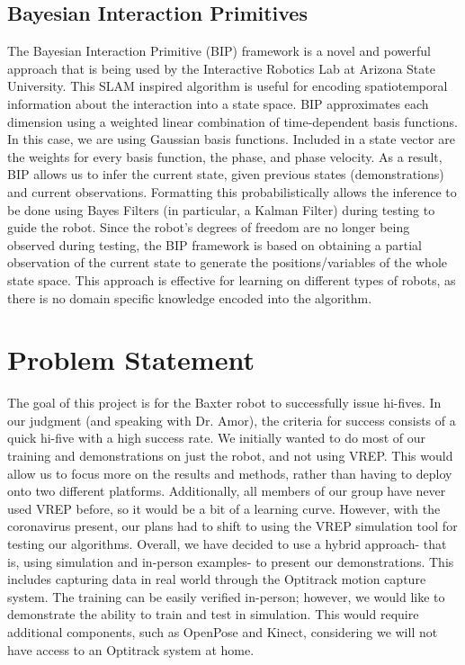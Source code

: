 \documentclass[letterpaper, 10 pt, conference]{ieeeconf}  %
\begin{document}
\subsection{Bayesian Interaction Primitives}
The Bayesian Interaction Primitive (BIP) framework is a novel and powerful approach that is being used by the Interactive Robotics Lab at Arizona State University. This SLAM inspired algorithm is useful for encoding spatiotemporal information about the interaction into a state space. BIP approximates each dimension using a weighted linear combination of time-dependent basis functions. In this case, we are using Gaussian basis functions. Included in a state vector are the weights for every basis function, the phase, and phase velocity. As a result, BIP allows us to infer the current state, given previous states (demonstrations) and current observations. Formatting this probabilistically allows the inference to be done using Bayes Filters (in particular, a Kalman Filter) during testing to guide the robot. Since the robot's degrees of freedom are no longer being observed during testing, the BIP framework is based on obtaining a partial observation of the current state to generate the positions/variables of the whole state space. This approach is effective for learning on different types of robots, as there is no domain specific knowledge encoded into the algorithm.


\section{Problem Statement}
The goal of this project is for the Baxter robot to successfully issue hi-fives. In our judgment (and speaking with Dr. Amor), the criteria for success consists of a quick hi-five with a high success rate. We initially wanted to do most of our training and demonstrations on just the robot, and not using VREP. This would allow us to focus more on the results and methods, rather than having to deploy onto two different platforms. Additionally, all members of our group have never used VREP before, so it would be a bit of a learning curve. However, with the coronavirus present, our plans had to shift to using the VREP simulation tool for testing our algorithms. Overall, we have decided to use a hybrid approach- that is, using simulation and in-person examples- to present our demonstrations. This includes capturing data in real world through the Optitrack motion capture system. The training can be easily verified in-person; however, we would like to demonstrate the ability to train and test in simulation. This would require additional components, such as OpenPose and Kinect, considering we will not have access to an Optitrack system at home.
\end{document}

